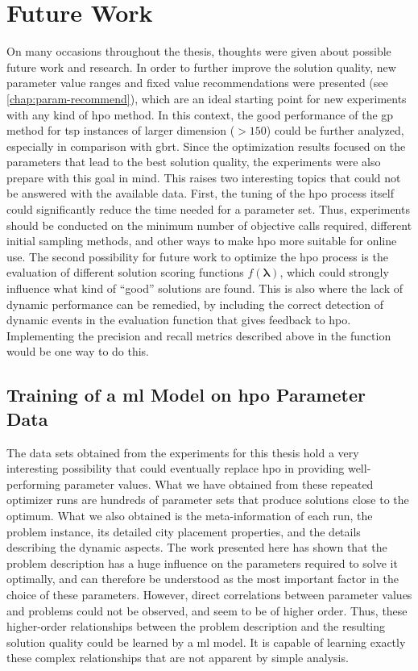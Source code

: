 \section{Future Work}

On many occasions throughout the thesis, thoughts were given about possible future work and research. 
In order to further improve the solution quality, new parameter value ranges and fixed value recommendations were presented (see \cref{chap:param-recommend}), which are an ideal starting point for new experiments with any kind of \gls{hpo} method. In this context, the good performance of the \gls{gp} method for \gls{tsp} instances of larger dimension ($>150$) could be further analyzed, especially in comparison with \gls{gbrt}. Since the optimization results focused on the parameters that lead to the best solution quality, the experiments were also prepare with this goal in mind. This raises two interesting topics that could not be answered with the available data. First, the tuning of the \gls{hpo} process itself could significantly reduce the time needed for a parameter set. Thus, experiments should be conducted on the minimum number of objective calls required, different initial sampling methods, and other ways to make \gls{hpo} more suitable for online use. The second possibility for future work to optimize the \gls{hpo} process is the evaluation of different solution scoring functions $f(\mathbf{\lambda})$, which could strongly influence what kind of \enquote{good} solutions are found. This is also where the lack of dynamic performance can be remedied, by including the correct detection of dynamic events in the evaluation function that gives feedback to \gls{hpo}. Implementing the precision and recall metrics described above in the function would be one way to do this.

\subsection{Training of a \gls{ml} Model on \gls{hpo} Parameter Data}

The data sets obtained from the experiments for this thesis hold a very interesting possibility that could eventually replace \gls{hpo} in providing well-performing parameter values. What we have obtained from these repeated optimizer runs are hundreds of parameter sets that produce solutions close to the optimum. What we also obtained is the meta-information of each run, the problem instance, its detailed city placement properties, and the details describing the dynamic aspects. The work presented here has shown that the problem description has a huge influence on the parameters required to solve it optimally, and can therefore be understood as the most important factor in the choice of these parameters. However, direct correlations between parameter values and problems could not be observed, and seem to be of higher order. Thus, these higher-order relationships between the problem description and the resulting solution quality could be learned by a \gls{ml} model. It is capable of learning exactly these complex relationships that are not apparent by simple analysis.

